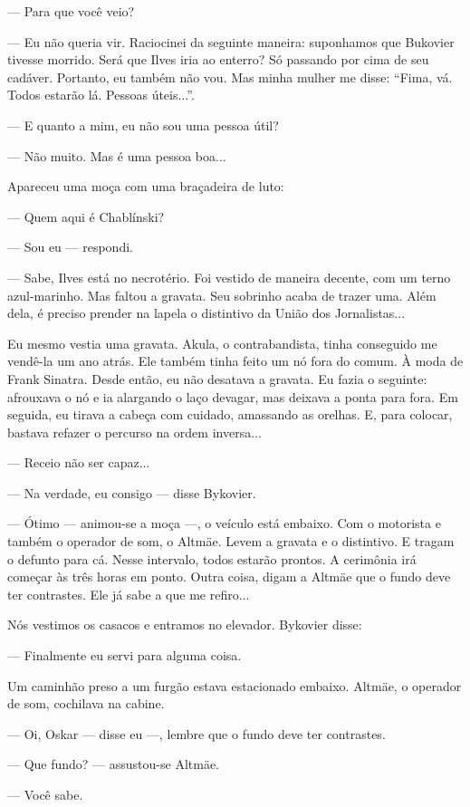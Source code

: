 --- Para que você veio?

--- Eu não queria vir. Raciocinei da seguinte maneira: suponhamos que
Bukovier tivesse morrido. Será que Ilves iria ao enterro? Só passando
por cima de seu cadáver. Portanto, eu também não vou. Mas minha mulher
me disse: ``Fima, vá. Todos estarão lá. Pessoas úteis...''.

--- E quanto a mim, eu não sou uma pessoa útil?

--- Não muito. Mas é uma pessoa boa...

Apareceu uma moça com uma braçadeira de luto:

--- Quem aqui é Chablínski?

--- Sou eu --- respondi.

--- Sabe, Ilves está no necrotério. Foi vestido de maneira decente, com
um terno azul-marinho. Mas faltou a gravata. Seu sobrinho acaba de
trazer uma. Além dela, é preciso prender na lapela o distintivo da União
dos Jornalistas...

Eu mesmo vestia uma gravata. Akula, o contrabandista, tinha conseguido
me vendê-la um ano atrás. Ele também tinha feito um nó fora do comum. À
moda de Frank Sinatra. Desde então, eu não desatava a gravata. Eu fazia
o seguinte: afrouxava o nó e ia alargando o laço devagar, mas deixava a
ponta para fora. Em seguida, eu tirava a cabeça com cuidado, amassando
as orelhas. E, para colocar, bastava refazer o percurso na ordem
inversa...

--- Receio não ser capaz...

--- Na verdade, eu consigo --- disse Bykovier.

--- Ótimo --- animou-se a moça ---, o veículo está embaixo. Com o
motorista e também o operador de som, o Altmäe. Levem a gravata e o
distintivo. E tragam o defunto para cá. Nesse intervalo, todos estarão
prontos. A cerimônia irá começar às três horas em ponto. Outra coisa,
digam a Altmäe que o fundo deve ter contrastes. Ele já sabe a que me
refiro...

Nós vestimos os casacos e entramos no elevador. Bykovier disse:

--- Finalmente eu servi para alguma coisa.

Um caminhão preso a um furgão estava estacionado embaixo. Altmäe, o
operador de som, cochilava na cabine.

--- Oi, Oskar --- disse eu ---, lembre que o fundo deve ter contrastes.

--- Que fundo? --- assustou-se Altmäe.

--- Você sabe.

